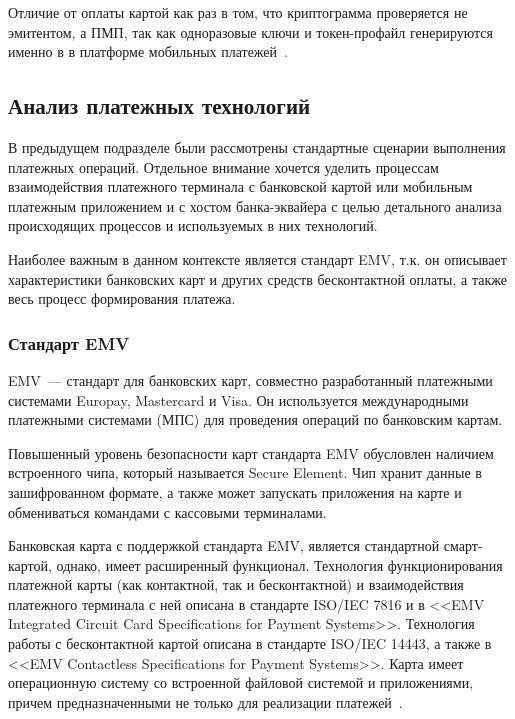 Отличие от оплаты картой как раз в том, что криптограмма проверяется не эмитентом, а ПМП, так как одноразовые ключи и токен-профайл генерируются именно в в платформе мобильных платежей~\cite{habr_nspk_mir_payment}.


\subsection{Анализ платежных технологий}

В предыдущем подразделе были рассмотрены стандартные сценарии выполнения платежных операций.
Отдельное внимание хочется уделить процессам взаимодействия платежного терминала с банковской картой или мобильным платежным приложением и с хостом банка-эквайера с целью детального анализа происходящих процессов и используемых в них технологий.

Наиболее важным в данном контексте является стандарт EMV, т.к. он описывает характеристики банковских карт и других средств бесконтактной оплаты, а также весь процесс формирования платежа.

\subsubsection{Стандарт EMV}

EMV~--- стандарт для банковских карт, совместно разработанный платежными системами Europay, Mastercard и Visa.
Он используется  международными платежными системами (МПС) для проведения операций по банковским картам.

Повышенный уровень безопасности карт стандарта EMV обусловлен наличием встроенного чипа, который называется Secure Element.
Чип хранит данные в зашифрованном формате, а также может запускать приложения на карте и обмениваться командами с кассовыми терминалами.

Банковская карта с поддержкой стандарта EMV, является стандартной смарт-картой, однако, имеет расширенный функционал.
Технология функционирования платежной карты (как контактной, так и бесконтактной) и взаимодействия платежного терминала с ней описана в стандарте ISO/IEC 7816 и в <<EMV Integrated Circuit Card Specifications for Payment Systems>>.
Технология работы с бесконтактной картой описана в стандарте ISO/IEC 14443, а также в <<EMV Contactless Specifications for Payment Systems>>.
Карта имеет операционную систему со встроенной файловой системой и приложениями, причем предназначенными не только для реализации платежей~\cite{emv_specifications_book}.


